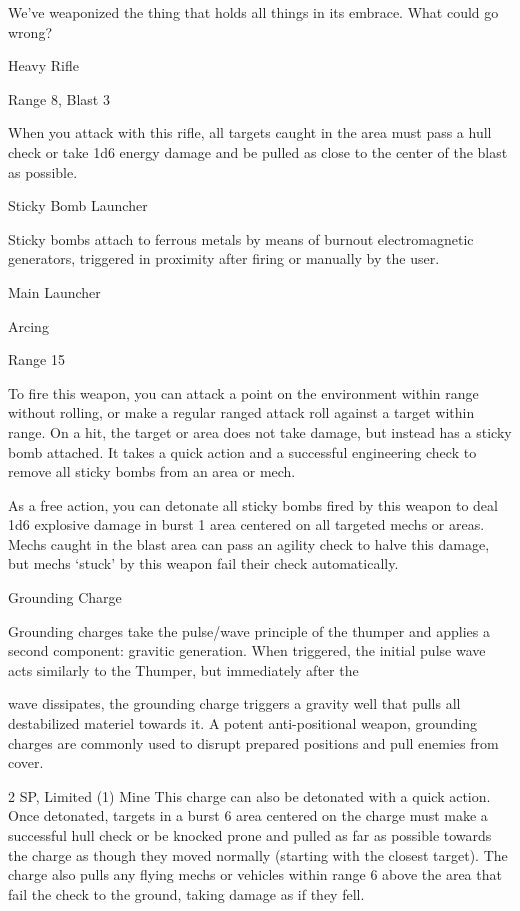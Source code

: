 We’ve weaponized the thing that holds all things in its embrace. What could go wrong?

Heavy Rifle

Range 8, Blast 3

When you attack with this rifle, all targets caught in the area must pass a hull check or take 1d6
energy damage and be pulled as close to the center of the blast as possible.


Sticky Bomb Launcher

Sticky bombs attach to ferrous metals by means of burnout electromagnetic generators, triggered in
proximity after firing or manually by the user.

Main Launcher

Arcing

Range 15

To fire this weapon, you can attack a point on the environment within range without rolling, or
make a regular ranged attack roll against a target within range. On a hit, the target or area does
not take damage, but instead has a sticky bomb attached. It takes a quick action and a
successful engineering check to remove all sticky bombs from an area or mech.

As a free action, you can detonate all sticky bombs fired by this weapon to deal 1d6 explosive
damage in burst 1 area centered on all targeted mechs or areas. Mechs caught in the blast area
can pass an agility check to halve this damage, but mechs ‘stuck’ by this weapon fail their check
automatically.


Grounding Charge

Grounding charges take the pulse/wave principle of the thumper and applies a second component: gravitic
generation. When triggered, the initial pulse wave acts similarly to the Thumper, but immediately after the

wave dissipates, the grounding charge triggers a gravity well that pulls all destabilized materiel towards it. A
potent anti-positional weapon, grounding charges are commonly used to disrupt prepared positions and
pull enemies from cover.

2 SP, Limited (1)
Mine
This charge can also be detonated with a quick action. Once detonated, targets in a burst 6 area
centered on the charge must make a successful hull check or be knocked prone and pulled as
far as possible towards the charge as though they moved normally (starting with the closest
target). The charge also pulls any flying mechs or vehicles within range 6 above the area that fail
the check to the ground, taking damage as if they fell.

